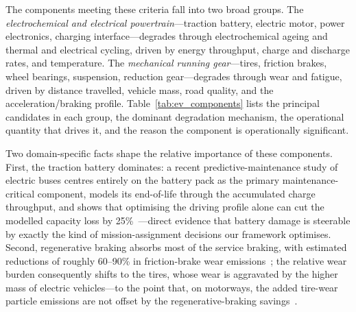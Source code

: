 \documentclass[11pt,a4paper]{article}
\theoremstyle{plain}
\theoremstyle{definition}
\theoremstyle{remark}
\begin{document}
The components meeting these criteria fall into two broad groups.
The \emph{electrochemical and electrical powertrain}---traction battery, electric motor, power electronics, charging interface---degrades through electrochemical ageing and thermal and electrical cycling, driven by energy throughput, charge and discharge rates, and temperature.
The \emph{mechanical running gear}---tires, friction brakes, wheel bearings, suspension, reduction gear---degrades through wear and fatigue, driven by distance travelled, vehicle mass, road quality, and the acceleration/braking profile.
Table~\ref{tab:ev_components} lists the principal candidates in each group, the dominant degradation mechanism, the operational quantity that drives it, and the reason the component is operationally significant.

Two domain-specific facts shape the relative importance of these components.
First, the traction battery dominates: a recent predictive-maintenance study of electric buses centres entirely on the battery pack as the primary maintenance-critical component, models its end-of-life through the accumulated charge throughput, and shows that optimising the driving profile alone can cut the modelled capacity loss by 25\%~\cite[Secs.~2,~4.2]{Ibrahim2025}---direct evidence that battery damage is steerable by exactly the kind of mission-assignment decisions our framework optimises.
Second, regenerative braking absorbs most of the service braking, with estimated reductions of roughly 60--90\% in friction-brake wear emissions~\cite[Sec.~6.1]{Fussell2022}; the relative wear burden consequently shifts to the tires, whose wear is aggravated by the higher mass of electric vehicles---to the point that, on motorways, the added tire-wear particle emissions are not offset by the regenerative-braking savings~\cite[Sec.~6.1]{Fussell2022}.
\end{document}

